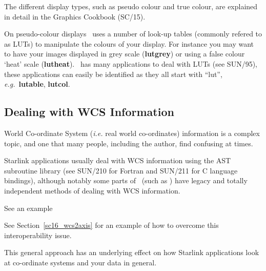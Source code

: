 \documentclass[twoside,11pt]{article}
\newcommand{\htmlref}[2]{#1}
\newcommand{\xref}[3]{#1}
\newcommand{\xlabel}[1]{}
\newcommand{\latex}[1]{#1}
\begin{document}
{The different display types, such as \xref{pseudo
colour}{sc15}{sc15_pseudo} and \xref{true colour}{sc15}{sc15_true},
are explained in detail in the \xref{Graphics Cookbook}{sc15}{} (SC/15).

On \xref{pseudo-colour displays}{sc15}{sc15_pseudo} \KAPPA\ uses a
number of \xref{look-up tables}{sun95}{se_lookuptables} (commonly
refered to as LUTs) to manipulate the colours of your display.  For
instance you may want to have your images displayed in grey scale
(\xref{{\bf lutgrey}}{sun95}{LUTGREY}) or using a false colour `heat'
scale (\xref{{\bf lutheat}}{sun95}{LUTHEAT}).  \KAPPA\ has many applications to
deal with LUTs (see \xref{SUN/95}{sun95}{}), these applications can
easily be identified as they all start with ``lut'', \emph{e.g.}\
\xref{{\bf lutable}}{sun95}{LUTABLE}, \xref{{\bf lutcol}}{sun95}{LUTCOL}.

\subsection{\xlabel{sc16_wcs}Dealing with WCS Information\label{sc16_wcs}}

\xref{World Co-ordinate System}{sun95}{se_wcsuse} (\emph{i.e.} real
world co-ordinates) information is a complex topic, and one that many people,
including the author, find confusing at times.

Starlink applications usually deal with WCS information using the
\xref{\footnotesize{AST}\normalsize}{sun210}{} subroutine library (see
SUN/210 for Fortran and \xref{SUN/211}{sun211}{} for C language
bindings), although notably some parts of \FIGARO\ (such as \SPECDRE)
have legacy and totally independent methods of dealing with WCS
information. 
\begin{htmlonly}
See \htmlref{an example}{sc16_wcs2axis}
\end{htmlonly} 
\latex{See Section~\ref{sc16_wcs2axis} for an example}
of how to overcome this interoperability issue.

This general approach has an underlying effect on how
Starlink applications look at co-ordinate systems and your data in
general.

}
\end{document}
